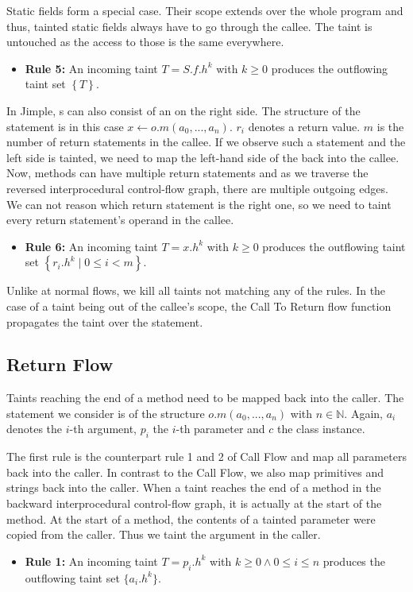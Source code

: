 \documentclass[../draft.tex]{subfiles}
\begin{document}
    Static fields form a special case. 
    Their scope extends over the whole program and thus, tainted static fields always have to go through the callee.
    The taint is untouched as the access to those is the same everywhere.
    \begin{itemize}
        \item[] \textbf{Rule 5:} An incoming taint $T = S.f.h^k$ with $k \geq 0$ produces the outflowing taint set $\left\{T\right\}$.
    \end{itemize}

    In Jimple, s can also consist of an  on the right side. 
    The structure of the statement is in this case $x \leftarrow o.m(a_0,...,a_n)$. $r_i$ denotes a return value. 
    $m$ is the number of return statements in the callee. 
    If we observe such a statement and the left side is tainted, we need to map the left-hand side of the  back into the callee. 
    Now, methods can have multiple return statements and as we traverse the reversed interprocedural control-flow graph, there are multiple outgoing edges. 
    We can not reason which return statement is the right one, so we need to taint every return statement's operand in the callee.
    \begin{itemize}
        \item[] \textbf{Rule 6:} An incoming taint $T = x.h^k$ with $k \geq 0$ produces the outflowing taint set $\left\{r_i.h^k \mid 0 \leq i < m \right\}$. 
    \end{itemize}

    Unlike at normal flows, we kill all taints not matching any of the rules. 
    In the case of a taint being out of the callee's scope, the Call To Return flow function propagates the taint over the statement.

    \subsection{Return Flow}
    Taints reaching the end of a method need to be mapped back into the caller. 
    The statement we consider is of the structure $o.m(a_0, ..., a_n)$ with $n \in \mathbb{N}$. 
    Again, $a_i$ denotes the $i$-th argument, $p_i$ the $i$-th parameter and $c$ the class instance.

    The first rule is the counterpart rule 1 and 2 of Call Flow\footnotemark{} and map all parameters back into the caller. 
    In contrast to the Call Flow, we also map primitives and strings back into the caller.
    When a taint reaches the end of a method in the backward interprocedural control-flow graph, it is actually at the start of the method.
    At the start of a method, the contents of a tainted parameter were copied from the caller. 
    Thus we taint the argument in the caller.    
    \begin{itemize}
        \item[] \textbf{Rule 1:} An incoming taint $T = p_i.h^k$ with $k \geq 0 \land 0 \leq i \leq n$ produces the outflowing taint set $\{a_i.h^k\}$.
    \end{itemize}
\end{document}
